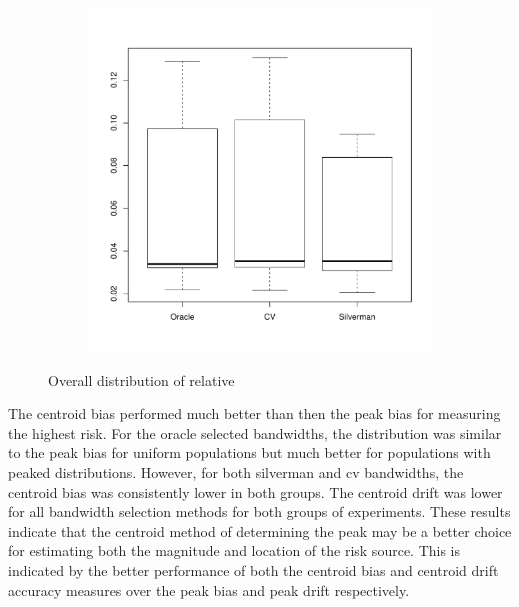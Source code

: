 \begin{figure}[htbp]
\begin{subfigure}[t]{0.45\textwidth}
        \includegraphics[width=\textwidth]{results/by_overall/relative-centroid-drift-peakpop-boxplot}
        \label{fig:discussion:overall_centroiddrift_boxplot:peak}
    \end{subfigure}
    \caption{Overall distribution of relative }
    \label{fig:discussion:overall_centroiddrift_boxplot}
\end{figure}

The \gls{centroid bias} performed much better than then the \gls{peak bias} for measuring the highest risk.
For the \gls{oracle} selected bandwidths, the distribution was similar to the \gls{peak bias} for uniform populations but much better for populations with peaked distributions.
However, for both \gls{silverman} and \gls{cv} bandwidths, the \gls{centroid bias} was consistently lower in both groups.
The \gls{centroid drift} was lower for all bandwidth selection methods for both groups of experiments.
These results indicate that the centroid method of determining the peak may be a better choice for estimating both the magnitude and location of the risk source.
This is indicated by the better performance of both the \gls{centroid bias} and \gls{centroid drift} accuracy measures over the \gls{peak bias} and \gls{peak drift} respectively.

